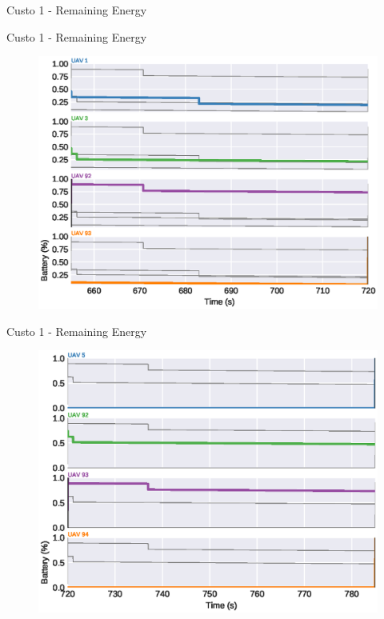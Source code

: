 \begin{frame}{Custo 1 - Remaining Energy}
\begin{figure}[!htb]
                    \end{figure}
                \end{frame}\begin{frame}{Custo 1 - Remaining Energy}
                    \begin{figure}[!htb]
                        \includegraphics[width=\textwidth]{custo_1/uav_remaining_energy_720.eps}
                    \end{figure}
                \end{frame}\begin{frame}{Custo 1 - Remaining Energy}
                    \begin{figure}[!htb]
                        \includegraphics[width=\textwidth]{custo_1/uav_remaining_energy_785.eps}

\end{figure}
\end{frame}
